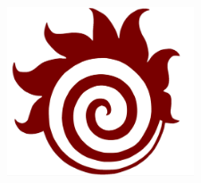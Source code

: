 \documentclass[22pt]{beamer}
\begin{document}
\begin{frame}[fragile]
\begin{textblock}{7.25}
\begin{figure}[htbp]
\hspace{1cm}
\includegraphics[height=5cm]{fireball-logo.png}
\end{figure}
\end{textblock}


\end{frame}
\end{document}
